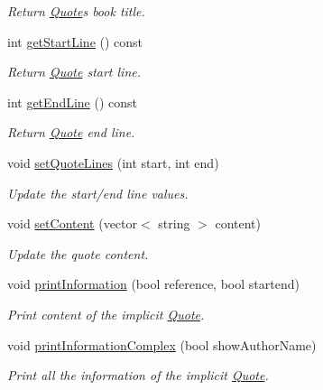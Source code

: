 \begin{DoxyCompactItemize}
\begin{DoxyCompactList}\small\item\em Return \hyperlink{class_quote}{Quote}\textquotesingle{}s book title. \end{DoxyCompactList}\item 
int \hyperlink{class_quote_abec5ea5330c351afab5a5a0be5c5b7fa}{get\+Start\+Line} () const 
\begin{DoxyCompactList}\small\item\em Return \hyperlink{class_quote}{Quote} start line. \end{DoxyCompactList}\item 
int \hyperlink{class_quote_aec85eae85f33b6e10458821f54f28fc9}{get\+End\+Line} () const 
\begin{DoxyCompactList}\small\item\em Return \hyperlink{class_quote}{Quote} end line. \end{DoxyCompactList}\item 
void \hyperlink{class_quote_a211e2593b1ef18dc7fd4a5da87384fa1}{set\+Quote\+Lines} (int start, int end)
\begin{DoxyCompactList}\small\item\em Update the start/end line values. \end{DoxyCompactList}\item 
void \hyperlink{class_quote_ab3af36f8b5649b115fca7eecbb294a59}{set\+Content} (vector$<$ string $>$ content)
\begin{DoxyCompactList}\small\item\em Update the quote content. \end{DoxyCompactList}\item 
void \hyperlink{class_quote_a0854af3d11ff805991e87ef6e9bebf69}{print\+Information} (bool reference, bool startend)
\begin{DoxyCompactList}\small\item\em Print content of the implicit \hyperlink{class_quote}{Quote}. \end{DoxyCompactList}\item 
void \hyperlink{class_quote_a60148444a9f56241ce8526a44f5baf1c}{print\+Information\+Complex} (bool show\+Author\+Name)
\begin{DoxyCompactList}\small\item\em Print all the information of the implicit \hyperlink{class_quote}{Quote}. \end{DoxyCompactList}\end{DoxyCompactItemize}
